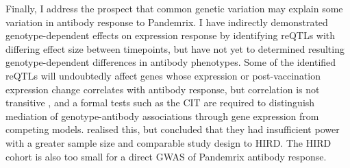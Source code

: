 Finally, I address the prospect that common genetic variation may explain some variation in antibody response to Pandemrix.
I have indirectly demonstrated genotype-dependent effects on expression response by identifying reQTLs with differing effect size between timepoints,
but have not yet to determined resulting genotype-dependent differences in antibody phenotypes.
Some of the identified reQTLs will undoubtedly affect genes whose expression or post-vaccination expression change correlates with antibody response, 
but correlation is not transitive \autocite{langford2001PropertyBeingPositively},
and a formal tests such as the \gls{CIT} \autocite{millstein2009DisentanglingMolecularRelationships} are required to distinguish mediation of genotype-antibody associations through gene expression from competing models.
\textcite{franco2013IntegrativeGenomicAnalysis} realised this, but concluded that they had insufficient power with a greater sample size and comparable study design to \gls{HIRD}.
The \gls{HIRD} cohort is also too small for a direct \gls{GWAS} of Pandemrix antibody response.
